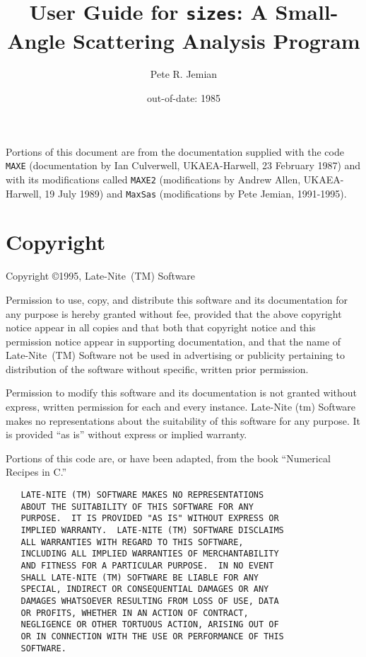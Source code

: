 \documentclass[letterpaper]{article}
\author{Pete R. Jemian}
\title{User Guide for \protect\texttt{sizes}: 
       A Small-Angle Scattering Analysis Program}
\date{out-of-date: 1985}
\def\tm{~(TM) }%
\begin{document}
\maketitle

{\scriptsize 
 Portions of this document are from the 
 documentation supplied with the code \texttt{MAXE} 
 (documentation by Ian Culverwell, UKAEA-Harwell, 23 February 
 1987) and with its modifications called \texttt{MAXE2} 
 (modifications by Andrew Allen, UKAEA-Harwell, 19 July 1989) 
 and \texttt{MaxSas} (modifications by Pete Jemian, 
 1991-1995).
}

\section{Copyright}

 Copyright \copyright 1995, Late-Nite\tm Software

{\scriptsize   Permission to use, copy, and distribute this 
  software and its documentation for any purpose is 
  hereby granted without fee, provided that the above 
  copyright notice appear in all copies and that both
  that copyright notice and this permission notice 
  appear in supporting documentation, and that the 
  name of Late-Nite\tm Software not be used in 
  advertising or publicity pertaining to distribution 
  of the software without specific, written prior 
  permission.
  
  Permission to modify this software and 
  its documentation is not granted without express, 
  written permission for each and every instance.
  Late-Nite (tm) Software makes no representations 
  about the suitability of this software for any 
  purpose.  It is provided ``as is'' without express or 
  implied warranty.

  Portions of this code are, or have been adapted, 
  from the book ``Numerical Recipes in C.''

  \begin{center}\begin{verbatim}
   LATE-NITE (TM) SOFTWARE MAKES NO REPRESENTATIONS 
   ABOUT THE SUITABILITY OF THIS SOFTWARE FOR ANY 
   PURPOSE.  IT IS PROVIDED "AS IS" WITHOUT EXPRESS OR 
   IMPLIED WARRANTY.  LATE-NITE (TM) SOFTWARE DISCLAIMS 
   ALL WARRANTIES WITH REGARD TO THIS SOFTWARE, 
   INCLUDING ALL IMPLIED WARRANTIES OF MERCHANTABILITY 
   AND FITNESS FOR A PARTICULAR PURPOSE.  IN NO EVENT 
   SHALL LATE-NITE (TM) SOFTWARE BE LIABLE FOR ANY 
   SPECIAL, INDIRECT OR CONSEQUENTIAL DAMAGES OR ANY 
   DAMAGES WHATSOEVER RESULTING FROM LOSS OF USE, DATA 
   OR PROFITS, WHETHER IN AN ACTION OF CONTRACT, 
   NEGLIGENCE OR OTHER TORTUOUS ACTION, ARISING OUT OF 
   OR IN CONNECTION WITH THE USE OR PERFORMANCE OF THIS 
   SOFTWARE.
  \end{verbatim}\end{center}
}
\end{document}
